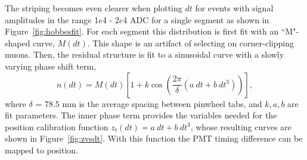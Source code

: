 The striping becomes even clearer when plotting $dt$ for events with signal amplitudes in the range  1$e$4 -  2$e$4 ADC for a single segment as shown in Figure~\ref{fig:hobbesfit}.
For each segment this distribution is first fit with an ``M"-shaped curve, $M(dt)$. 
This shape is an artifact of selecting on corner-clipping muons. 
Then, the residual structure is fit to a sinusoidal curve with a slowly varying phase shift term,
\begin{equation}
	n(dt) = M(dt)\left[1 + k\cos\left(\frac{2\pi}{\delta}\left(a~dt + b~dt^3\right)\right)\right],
\end{equation}
where $\delta$ = 78.5 mm is the average spacing between pinwheel tabs, and $k, a, b$ are fit parameters.
The inner phase term provides the variables needed for the position calibration function $z_t(dt) = a~dt + b~dt^3$, whose resulting curves are shown in Figure~\ref{fig:zvsdt}.
With this function the PMT timing difference can be mapped to position.

